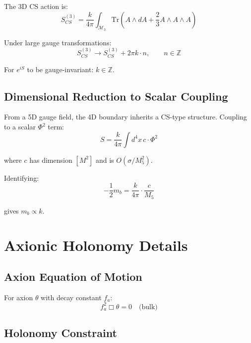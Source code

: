 \documentclass[11pt,a4paper]{article}
\newcommand{\Mfive}{M_5}
\newcommand{\mb}{m_b}
\theoremstyle{definition}
\theoremstyle{plain}
\theoremstyle{remark}
\begin{document}
The 3D CS action is:
\begin{equation}
S_{CS}^{(3)} = \frac{k}{4\pi} \int_{\mathcal{M}_3} \mathrm{Tr}\left(A \wedge dA + \frac{2}{3}A \wedge A \wedge A\right)
\label{eq:CS-3D}
\end{equation}

Under large gauge transformations:
\begin{equation}
S_{CS}^{(3)} \to S_{CS}^{(3)} + 2\pi k \cdot n, \qquad n \in \mathbb{Z}
\label{eq:CS-gauge}
\end{equation}

For $e^{iS}$ to be gauge-invariant: $k \in \mathbb{Z}$.

\subsection{Dimensional Reduction to Scalar Coupling}

From a 5D gauge field, the 4D boundary inherits a CS-type structure.
Coupling to a scalar $\Phi^2$ term:
\begin{equation}
S = \frac{k}{4\pi} \int d^4x \, c \cdot \Phi^2
\label{eq:CS-scalar}
\end{equation}

where $c$ has dimension $[M^2]$ and is $O(\sigma/\Mfive^2)$.

Identifying:
\begin{equation}
-\frac{1}{2}\mb = \frac{k}{4\pi} \cdot \frac{c}{\Mfive}
\label{eq:CS-identify}
\end{equation}

gives $\mb \propto k$.

\section{Axionic Holonomy Details}
\label{app:axion}

\subsection{Axion Equation of Motion}

For axion $\theta$ with decay constant $f_a$:
\begin{equation}
f_a^2 \Box \theta = 0 \quad \text{(bulk)}
\label{eq:axion-eom}
\end{equation}

\subsection{Holonomy Constraint}
\end{document}
